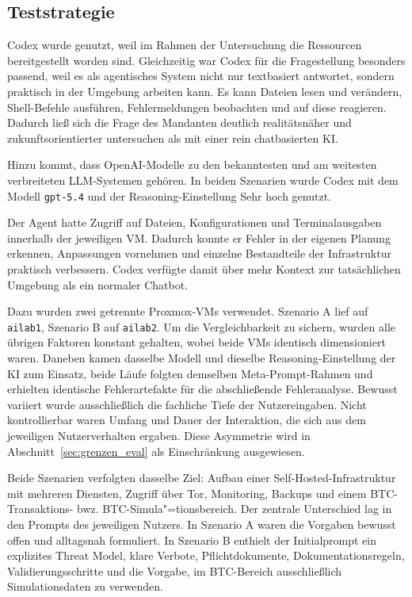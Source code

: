 \subsection{Teststrategie} \label{sec:teststrategie}

Codex wurde genutzt, weil im Rahmen der Untersuchung die Ressourcen bereitgestellt worden sind. Gleichzeitig war Codex für die Fragestellung besonders passend, weil es als agentisches System nicht nur textbasiert antwortet, sondern praktisch in der Umgebung arbeiten kann. Es kann Dateien lesen und verändern, Shell-Befehle ausführen, Fehlermeldungen beobachten und auf diese reagieren. Dadurch ließ sich die Frage des Mandanten deutlich realitätsnäher und zukunftsorientierter untersuchen als mit einer rein chatbasierten \ac{KI}.

Hinzu kommt, dass OpenAI-Modelle zu den bekanntesten und am weitesten verbreiteten \ac{LLM}-Systemen gehören. In beiden Szenarien wurde Codex mit dem Modell \texttt{gpt-5.4} und der Reasoning-Einstellung \glqq Sehr hoch\grqq{} genutzt.\cite{openaiGPT54}

Der Agent hatte Zugriff auf Dateien, Konfigurationen und Terminalausgaben innerhalb der jeweiligen \acs{VM}. Dadurch konnte er Fehler in der eigenen Planung erkennen, Anpassungen vornehmen und einzelne Bestandteile der Infrastruktur praktisch verbessern. Codex verfügte damit über mehr Kontext zur tatsächlichen Umgebung als ein normaler Chatbot.

Dazu wurden zwei getrennte Proxmox-\acp{VM} verwendet. Szenario A lief auf \texttt{ailab1}, Szenario B auf \texttt{ailab2}.
Um die Vergleichbarkeit zu sichern, wurden alle übrigen Faktoren konstant gehalten, wobei beide \acp{VM} identisch dimensioniert waren. Daneben kamen dasselbe Modell und dieselbe Reasoning-Einstellung der \ac{KI} zum Einsatz, beide Läufe folgten demselben Meta-Prompt-Rahmen und erhielten identische Fehlerartefakte für die abschließende Fehleranalyse. 
Bewusst variiert wurde ausschließlich die fachliche Tiefe der Nutzereingaben. Nicht kontrollierbar waren Umfang und Dauer der Interaktion, die sich aus dem jeweiligen Nutzerverhalten ergaben.\cite{chen2023promptreview}
Diese Asymmetrie wird in Abschnitt~\ref{sec:grenzen_eval} als Einschränkung
ausgewiesen.

Beide Szenarien verfolgten dasselbe Ziel: Aufbau einer Self-Hosted-Infrastruktur mit mehreren Diensten, Zugriff über Tor, Monitoring, Backups und einem \ac{BTC}-Transaktions- bwz. \ac{BTC}-Simula"=tionsbereich. Der zentrale Unterschied lag in den Prompts des jeweiligen Nutzers. In Szenario A waren die Vorgaben bewusst offen und alltagsnah formuliert. In Szenario B enthielt der Initialprompt ein explizites Threat Model, klare Verbote, Pflichtdokumente, Dokumentationsregeln, Validierungsschritte und die Vorgabe, im \ac{BTC}-Bereich ausschließlich Simulationsdaten zu verwenden.


